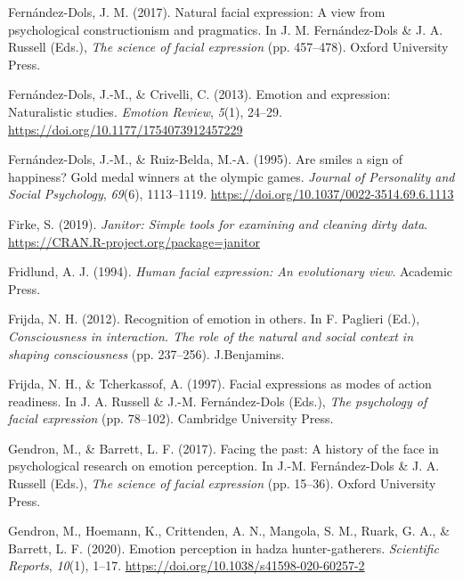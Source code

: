 \documentclass[
  english,
  man]{apa7}
\newlength{\cslhangindent}
\newenvironment{cslreferences}%
  {\setlength{\parindent}{0pt}%
  \everypar{\setlength{\hangindent}{\cslhangindent}}\ignorespaces}%
  {\par}
\begin{document}
\begin{cslreferences}
\leavevmode\hypertarget{ref-dols2017natural}{}%
Fernández-Dols, J. M. (2017). Natural facial expression: A view from psychological constructionism and pragmatics. In J. M. Fernández-Dols \& J. A. Russell (Eds.), \emph{The science of facial expression} (pp. 457--478). Oxford University Press.

\leavevmode\hypertarget{ref-fernandez2013emotion}{}%
Fernández-Dols, J.-M., \& Crivelli, C. (2013). Emotion and expression: Naturalistic studies. \emph{Emotion Review}, \emph{5}(1), 24--29. \url{https://doi.org/10.1177/1754073912457229}

\leavevmode\hypertarget{ref-fernandez1995smiles}{}%
Fernández-Dols, J.-M., \& Ruiz-Belda, M.-A. (1995). Are smiles a sign of happiness? Gold medal winners at the olympic games. \emph{Journal of Personality and Social Psychology}, \emph{69}(6), 1113--1119. \url{https://doi.org/10.1037/0022-3514.69.6.1113}

\leavevmode\hypertarget{ref-R-janitor}{}%
Firke, S. (2019). \emph{Janitor: Simple tools for examining and cleaning dirty data}. \url{https://CRAN.R-project.org/package=janitor}

\leavevmode\hypertarget{ref-fridlund1994human}{}%
Fridlund, A. J. (1994). \emph{Human facial expression: An evolutionary view}. Academic Press.

\leavevmode\hypertarget{ref-frijda2012recognition}{}%
Frijda, N. H. (2012). Recognition of emotion in others. In F. Paglieri (Ed.), \emph{Consciousness in interaction. The role of the natural and social context in shaping consciousness} (pp. 237--256). J.Benjamins.

\leavevmode\hypertarget{ref-frijda1997facial}{}%
Frijda, N. H., \& Tcherkassof, A. (1997). Facial expressions as modes of action readiness. In J. A. Russell \& J.-M. Fernández-Dols (Eds.), \emph{The psychology of facial expression} (pp. 78--102). Cambridge University Press.

\leavevmode\hypertarget{ref-gendron2017facing}{}%
Gendron, M., \& Barrett, L. F. (2017). Facing the past: A history of the face in psychological research on emotion perception. In J.-M. Fernández-Dols \& J. A. Russell (Eds.), \emph{The science of facial expression} (pp. 15--36). Oxford University Press.

\leavevmode\hypertarget{ref-gendron2018emotion}{}%
Gendron, M., Hoemann, K., Crittenden, A. N., Mangola, S. M., Ruark, G. A., \& Barrett, L. F. (2020). Emotion perception in hadza hunter-gatherers. \emph{Scientific Reports}, \emph{10}(1), 1--17. \url{https://doi.org/10.1038/s41598-020-60257-2}


\end{cslreferences}
\end{document}
